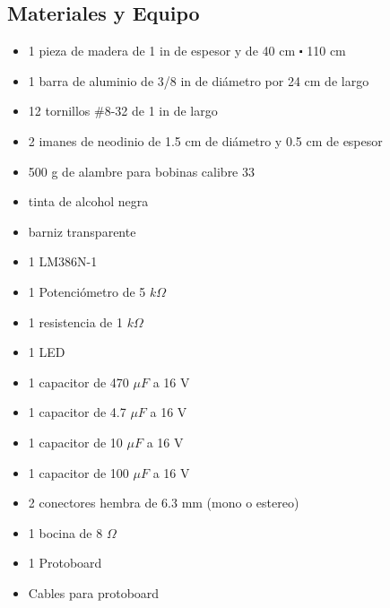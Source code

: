 \subsection{Materiales y Equipo}
\begin{multicols}{2}
\begin{itemize}
 \item 1 pieza de madera de 1 in de espesor y de 40 cm $\centerdot$ 110 cm
 \item 1 barra de aluminio de 3/8 in de di\'ametro por 24 cm de largo
 \item 12 tornillos \#8-32 de 1 in de largo
 \item 2 imanes de neodinio de 1.5 cm de di\'ametro y 0.5 cm de espesor
 \item 500 g de alambre para bobinas calibre 33
 \item tinta de alcohol negra
 \item barniz transparente
 \item 1 LM386N-1
 \item 1 Potenci\'ometro de 5 $k \Omega$
 \item 1 resistencia de 1 $k \Omega$
 \item 1 LED
 \item 1 capacitor de 470 $\mu F$ a 16 V
 \item 1 capacitor de 4.7 $\mu F$ a 16 V
 \item 1 capacitor de 10 $\mu F$ a 16 V
 \item 1 capacitor de 100 $\mu F$ a 16 V
 \item 2 conectores hembra de 6.3 mm (mono o estereo)
 \item 1 bocina de 8 $\Omega$
 \item 1 Protoboard
 \item Cables para protoboard
\end{itemize}
\end{multicols}
